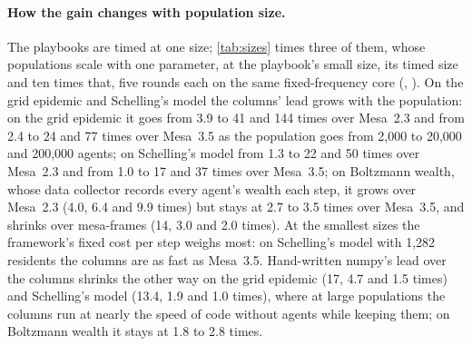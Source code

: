 \paragraph{How the gain changes with population size.} The playbooks are timed at one size;
\cref{tab:sizes} times three of them, whose populations scale with one parameter, at the
playbook's small size, its timed size and ten times that, five rounds each on the same
fixed-frequency core (, ). On the
grid epidemic and Schelling's model the columns' lead grows with the population: on the grid
epidemic it goes from 3.9 to 41 and 144
times over Mesa~2.3 and from 2.4 to 24 and 77 times over Mesa~3.5 as the population goes from
2,000 to 20,000 and 200,000 agents; on Schelling's model from 1.3 to 22 and 50 times over
Mesa~2.3 and from 1.0 to 17 and 37 times over Mesa~3.5; on Boltzmann wealth, whose data
collector records every agent's wealth each step, it grows over Mesa~2.3 (4.0, 6.4 and 9.9
times) but stays at 2.7 to 3.5 times over Mesa~3.5, and shrinks over mesa-frames (14, 3.0 and
2.0 times). At the smallest sizes the framework's fixed cost per step weighs most: on Schelling's model with
1,282 residents the columns are as fast as Mesa~3.5. Hand-written numpy's lead over the columns
shrinks the other way on the grid epidemic (17, 4.7 and 1.5 times) and Schelling's model (13.4,
1.9 and 1.0 times), where at large populations the columns run at nearly the speed of code
without agents while keeping them; on Boltzmann wealth it stays at 1.8 to 2.8 times.

\begin{table}[tbp]
  \centering
  \small
  \caption{The step-time speed-ups of \modelly{}'s columns, and of hand-written numpy over the
  columns, at three population sizes: the playbook's small size, its timed size (as in
  \cref{tab:playbooks}) and ten times that at the same density. Medians of five rotated rounds
  on one fixed-frequency core; agents at the end of the run. Generated by
  .}
  \label{tab:sizes}
  \setlength{\tabcolsep}{4pt}
  
\end{table}

